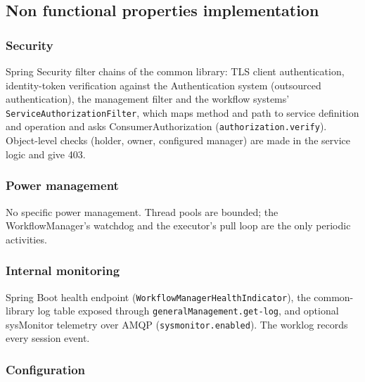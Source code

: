 \documentclass[a4paper]{arrowhead}
\begin{document}
\subsection{Non functional properties implementation}
\subsubsection{Security}
Spring Security filter chains of the common library: TLS client authentication, identity-token verification against
the Authentication system (outsourced authentication), the management filter and the workflow systems'
\texttt{Service\allowbreak{}Authorization\allowbreak{}Filter}, which maps method and path to service definition and operation and asks
ConsumerAuthorization (\texttt{authorization.\allowbreak{}verify}). Object-level checks (holder, owner, configured manager) are made in
the service logic and give 403.
\subsubsection{Power management}
No specific power management. Thread pools are bounded; the WorkflowManager's watchdog and the executor's pull loop are
the only periodic activities.
\subsubsection{Internal monitoring}
Spring Boot health endpoint (\texttt{Workflow\allowbreak{}Manager\allowbreak{}Health\allowbreak{}Indicator}),
the common-library log table exposed through \texttt{general\allowbreak{}Management.\allowbreak{}get-\allowbreak{}log}, and optional sysMonitor telemetry over
AMQP (\texttt{sysmonitor.\allowbreak{}enabled}). The worklog records every session event.
\subsubsection{Configuration}
\end{document}
